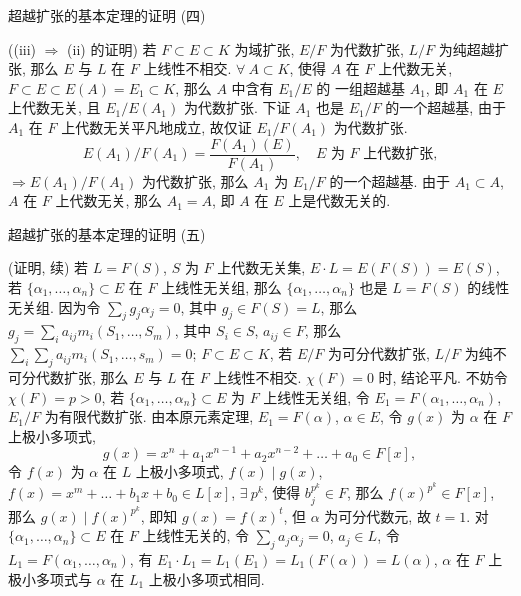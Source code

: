 
\begin{frame}{超越扩张的基本定理的证明 (四)}

\startproof[bg=yellow, fg=red]((iii) $\Longrightarrow$ (ii) 的证明)
 若 $F \subset E \subset K$ 为域扩张, $E/F$ 为代数扩张,
$L/F$ 为纯超越扩张, 那么 $E$ 与 $L$ 在 $F$ 上线性不相交.
$\forall\ A \subset K$, 使得 $A$ 在 $F$ 上代数无关,
$F \subset E \subset E(A) = E_1 \subset K$, 那么 $A$ 中含有 $E_1/E$ 的
一组超越基 $A_1$, 即 $A_1$ 在 $E$ 上代数无关, 且 $E_1/E(A_1)$ 为代数扩张.
下证 $A_1$ 也是 $E_1/F$ 的一个超越基,
由于 $A_1$ 在 $F$ 上代数无关平凡地成立, 故仅证 $E_1/F(A_1)$ 为代数扩张.
\[
E(A_1)/F(A_1) = \frac{F(A_1)(E)}{F(A_1)}, \quad
E \text{ 为 } F \text{ 上代数扩张,}
\]
$\Longrightarrow E(A_1)/F(A_1)$ 为代数扩张,
那么 $A_1$ 为 $E_1/F$ 的一个超越基.
由于 $A_1 \subset A$, $A$ 在 $F$ 上代数无关, 那么 $A_1 = A$,
即 $A$ 在 $E$ 上是代数无关的.

\end{frame}


\begin{frame}{超越扩张的基本定理的证明 (五)}

\startproof[bg=yellow, fg=red](证明, 续)
 若 $L = F(S)$, $S$ 为 $F$ 上代数无关集,
$E \cdot L = E(F(S)) = E(S)$,
若 $\{ \alpha_1, \dots, \alpha_n \} \subset E$ 在 $F$ 上线性无关组,
那么 $\{ \alpha_1, \dots, \alpha_n \}$ 也是 $L = F(S)$ 的线性无关组.
因为令 $\sum_j g_j \alpha_j = 0$, 其中 $g_j \in F(S) = L$,
那么 $g_j = \sum_i a_{ij} m_i(S_1, \dots, S_m)$, 其中 $S_i \in S$,
$a_{ij} \in F$,
那么 $\sum_i \sum_j a_{ij} m_i(S_1, \dots, s_m) = 0$;
 $F \subset E \subset K$, 若 $E/F$ 为可分代数扩张,
$L/F$ 为纯不可分代数扩张, 那么 $E$ 与 $L$ 在 $F$ 上线性不相交.
$\chi(F) = 0$ 时, 结论平凡.
不妨令 $\chi(F) = p > 0$, 若 $\{ \alpha_1, \dots, \alpha_n \} \subset E$
为 $F$ 上线性无关组, 令 $E_1 = F(\alpha_1, \dots, \alpha_n)$,
$E_1/F$ 为有限代数扩张.
由本原元素定理, $E_1 = F(\alpha)$, $\alpha \in E$,
令 $g(x)$ 为 $\alpha$ 在 $F$ 上极小多项式,
\[
g(x) = x^n + a_1 x^{n-1} + a_2 x^{n-2} + \dots + a_0 \in F[x],
\]
令 $f(x)$ 为 $\alpha$ 在 $L$ 上极小多项式, $f(x) \mid g(x)$,
$f(x) = x^m + \dots + b_1 x + b_0 \in L[x]$,
$\exists\ p^k$, 使得 $b_j^{p^k} \in F$, 那么 $f(x)^{p^k} \in F[x]$,
那么 $g(x) \mid f(x)^{p^k}$,
即知 $g(x) = f(x)^t$, 但 $\alpha$ 为可分代数元, 故 $t = 1$.
对 $\{ \alpha_1, \dots, \alpha_n \} \subset E$ 在 $F$ 上线性无关的,
令 $\sum_j a_j \alpha_j = 0$, $a_j \in L$,
令 $L_1 = F(\alpha_1, \dots, \alpha_n)$, 有
$E_1 \cdot L_1 = L_1(E_1) = L_1(F(\alpha)) = L(\alpha)$,
$\alpha$ 在 $F$ 上极小多项式与 $\alpha$ 在 $L_1$ 上极小多项式相同.

\end{frame}

